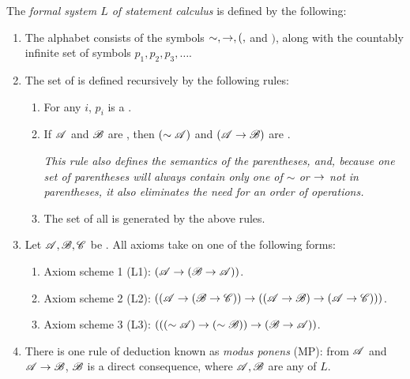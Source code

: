 \begin{definition}
  The \textit{formal system \(L\) of statement calculus} is defined by the following:
  \begin{enumerate}
    \item The alphabet consists of the symbols \(\sim, \rightarrow, (,\) and \()\), along with the countably infinite set of symbols \(p_1, p_2, p_3, \dots\).

    \item The set of \wfs{} is defined recursively by the following rules:

      \begin{enumerate}
        \item For any \(i\), \(p_i\) is a \wf{}.
        
        \item If \(\mathscr{A}\) and \(\mathscr{B}\) are \wfs{}, then \((\sim\mathscr{A})\) and \((\mathscr{A} \rightarrow \mathscr{B})\) are \wfs{}.

          \textit{This rule also defines the semantics of the parentheses, and, because one set of parentheses will always contain only one of \(\sim\) or \(\rightarrow\) not in parentheses, it also eliminates the need for an order of operations.}

        \item The set of all \wfs{} is generated by the above rules.
      \end{enumerate}

    \item Let \(\mathscr{A}, \mathscr{B}, \mathscr{C}\) be \wfs. All axioms take on one of the following forms:

      \begin{enumerate}
        \item Axiom scheme 1 (L1): \((\mathscr{A} \rightarrow (\mathscr{B} \rightarrow \mathscr{A}))\).
        \item Axiom scheme 2 (L2):
          \(((\mathscr{A} \rightarrow (\mathscr{B} \rightarrow \mathscr{C})) \rightarrow ((\mathscr{A} \rightarrow \mathscr{B}) \rightarrow (\mathscr{A} \rightarrow \mathscr{C})))\).
        \item Axiom scheme 3 (L3): \((((\sim\mathscr{A}) \rightarrow (\sim\mathscr{B})) \rightarrow (\mathscr{B} \rightarrow \mathscr{A}))\).
      \end{enumerate}

    \item There is one rule of deduction known as \textit{modus ponens} (MP): from \(\mathscr{A}\) and \(\mathscr{A} \rightarrow \mathscr{B}\), \(\mathscr{B}\) is a direct consequence, where \(\mathscr{A}, \mathscr{B}\) are any \wfs of \(L\).
  \end{enumerate}
\end{definition}


